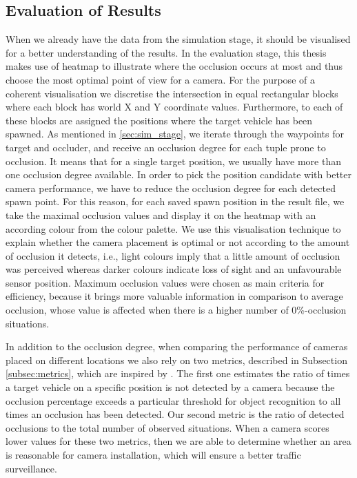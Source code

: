 \subsection{Evaluation of Results} \label{subsec:results_eval}
When we already have the data from the simulation stage, it should be visualised for a better understanding of the results. In the evaluation stage, this thesis makes use of heatmap to illustrate where the occlusion occurs at most and thus choose the most optimal point of view for a camera. For the purpose of a coherent visualisation we discretise the intersection in equal rectangular blocks where each block has world X and Y coordinate values. Furthermore, to each of these blocks are assigned the positions where the target vehicle has been spawned. As mentioned in \ref{sec:sim_stage}, we iterate through the waypoints for target and occluder, and receive an occlusion degree for each tuple prone to occlusion. It means that for a single target position, we usually have more than one occlusion degree available. In order to pick the position candidate with better camera performance, we have to reduce the occlusion degree for each detected spawn point. For this reason, for each saved spawn position in the result file, we take the maximal occlusion values and display it on the heatmap with an according colour from the colour palette. We use this visualisation technique to explain whether the camera placement is optimal or not according to the amount of occlusion it detects, i.e., light colours imply that a little amount of occlusion was perceived whereas darker colours indicate loss of sight and an unfavourable sensor position. Maximum occlusion values were chosen as main criteria for efficiency, because it brings more valuable information in comparison to average occlusion, whose value is affected when there is a higher number of 0\%-occlusion situations. 

In addition to the occlusion degree, when comparing the performance of cameras placed on different locations we also rely on two metrics, described in Subsection \ref{subsec:metrics}, which are inspired by \cite{occlusion_degree_model}. The first one estimates the ratio of times a target vehicle on a specific position is not detected by a camera because the occlusion percentage exceeds a particular threshold for object recognition to all times an occlusion has been detected. Our second metric is the ratio of detected occlusions to the total number of observed situations. When a camera scores lower values for these two metrics, then we are able to determine whether an area is reasonable for camera installation, which will ensure a better traffic surveillance. 
